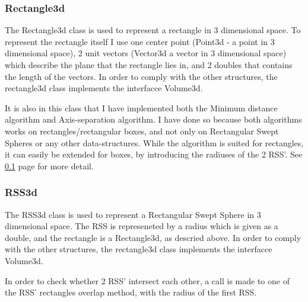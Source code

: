 \subsubsection{Rectangle3d}
\label{rectangle3d}
The Rectangle3d class is used to represent a rectangle in 3 dimensional space. To represent the rectangle itself I use one center point (Point3d - a point in 3 dimensional space), 2 unit vectors (Vector3d a vector in 3 dimensional space) which describe the plane that the rectangle lies in, and 2 doubles that contains the length of the vectors. In order to comply with the other structures, the rectangle3d class implements the interfacce Volume3d.

It is also in this class that I have implemented both the Minimum distance algorithm and Axis-separation algorithm. I have done so because both algorithms works on rectangles/rectangular boxes, and not only on Rectangular Swept Spheres or any other data-structures. While the algorithm is suited for rectangles, it can easily be extended for boxes, by introducing the radiuses of the 2 RSS'. See \ref{} page \pageref{} for more detail.

\subsubsection{RSS3d}
\label{RSS3d}
The RSS3d class is used to represent a Rectangular Swept Sphere in 3 dimensional space. The RSS is represeneted by a radius which is given as a double, and the rectangle is a Rectangle3d, as descried above. In order to comply with the other structures, the rectangle3d class implements the interfacce Volume3d.

In order to check whether 2 RSS' intersect each other, a call is made to one of the RSS' rectangles overlap method, with the radius of the first RSS.

\subsection{}

